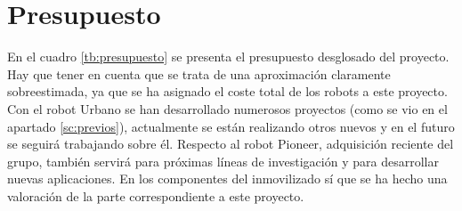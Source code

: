 
\chapter{Presupuesto}\label{presupuesto}

En el cuadro \ref{tb:presupuesto} se presenta el presupuesto desglosado del proyecto. Hay que tener en cuenta que se trata de una aproximación claramente sobreestimada, ya que se ha asignado el coste total de los robots a este proyecto. Con el robot Urbano se han desarrollado numerosos proyectos (como se vio en el apartado \ref{sc:previos}), actualmente se están realizando otros nuevos y en el futuro se seguirá trabajando sobre él. Respecto al robot Pioneer, adquisición reciente del grupo, también servirá para próximas líneas de investigación y para desarrollar nuevas aplicaciones. En los componentes del inmovilizado sí que se ha hecho una valoración de la parte correspondiente a este proyecto.

